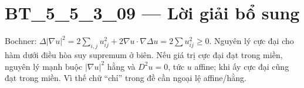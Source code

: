 \documentclass[10pt,a4paper]{article}
\begin{document}
\section*{BT\_5\_5\_3\_09 — Lời giải bổ sung}
Bochner: $\Delta|\nabla u|^2=2\sum_{i,j}u_{ij}^2+2\nabla u\cdot\nabla\Delta u=2\sum u_{ij}^2\ge0$. Nguyên lý cực đại cho hàm dưới điều hòa suy supremum ở biên. Nếu giá trị cực đại đạt trong miền, nguyên lý mạnh buộc $|\nabla u|^2$ hằng và $D^2u=0$, tức $u$ affine; khi ấy cực đại cũng đạt trong miền. Vì thế chữ ``chỉ'' trong đề cần ngoại lệ affine/hằng.
\end{document}
